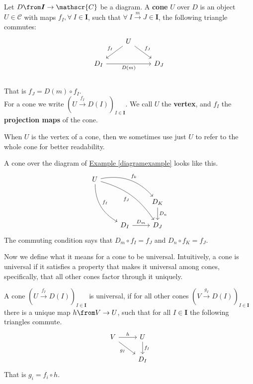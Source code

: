 \begin{definition}
  Let $D \from \bm{I} \to \mathscr{C}$ be a diagram.
  A \textbf{cone} $U$ over $D$ is an object $U \in \mathscr{C}$
  with maps $f_I, \forall\ I \in \bm{I}$, such that
  $\forall\ I \overset{m}{\to} J \in \bm{I}$, the following triangle commutes:
  \[
    \begin{tikzcd}
      & U \arrow[dl, swap, "f_I"] \arrow{dr}{f_J}&\\
      D_I \arrow[rr, swap, "D(m)"] & & D_J\\
    \end{tikzcd}
  \]
  That is $f_J = D(m) \circ f_I$.\\
  For a cone we write $(U \overset{f_I}{\to} D(I))_{I\in \bm{I}}$.
  We call $U$ the \textbf{vertex}, and $f_I$ the \textbf{projection maps} of the cone.
\end{definition}
\begin{remark}
  When $U$ is the vertex of a cone, then we sometimes use just $U$ to refer to the whole cone
  for better readability.
\end{remark}
\begin{example}
  A cone over the diagram of
  \hyperref[diagramexample]{Example \ref*{diagramexample}} looks like this.
  \[
    \begin{tikzcd}
      U \arrow[bend right=30]{ddr}{f_I} \arrow[bend left=30]{drr}{f_k} \arrow[bend left=20, swap]{ddrr}{f_J}&   &\\
      & & D_K \arrow{d}{D_n} \\
      & D_I \arrow{r}{D_m} & D_J
    \end{tikzcd}
  \]
  The commuting condition says that $D_m \circ f_I = f_J$ and $D_n \circ f_K = f_J$.
\end{example}


Now we define what it means for a cone to be universal. Intuitively,
a cone is universal if it satisfies a property that makes it universal among cones,
specifically, that all other cones factor through it uniquely.

\begin{definition}
  A cone $(U \overset{f_I}{\to} D(I))_{I\in \bm{I}}$ is universal, if
  for all other cones $(V \overset{g_I}{\to} D(I))_{I\in \bm{I}}$ there is a unique
  map $h \from V \to U$, such that for all $I \in \bm{I}$
  the following triangles commute.
  \[
    \begin{tikzcd}
      V \arrow[dr, swap, "g_I"] \arrow{r}{h} & U \arrow{d}{f_I} \\
      & D_I
    \end{tikzcd}
  \]
  That is $g_i = f_i \circ h$.
\end{definition}

